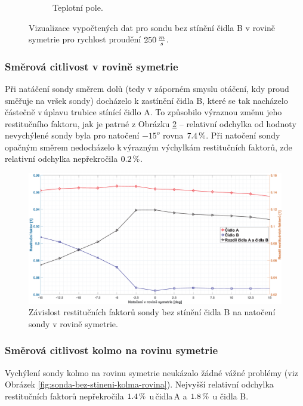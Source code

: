 \begin{figure}[ht!]
\begin{subfigure}{0.45\textwidth}
                    \caption{Teplotní pole.}
                \end{subfigure}
                \caption{Vizualizace vypočtených dat pro sondu bez stínění čidla B v rovině symetrie pro rychlost proudění $250 \, \frac{m}{s}$.}
                \label{fig:sonda-bez-stineni-vizualizace}
            \end{figure}


        \newpage
        \subsubsection{Směrová citlivost v rovině symetrie}
            Při natáčení sondy směrem dolů (tedy v záporném smyslu otáčení, kdy proud směřuje na vršek sondy) docházelo k zastínění čidla B, které se tak nacházelo částečně v\,úplavu trubice stínící čidlo A. To způsobilo výraznou změnu jeho restitučního faktoru, jak je patrné z Obrázku \ref{fig:sonda-bez-stineni-rovina-symetrie} – relativní odchylka od hodnoty nevychýlené sondy byla pro natočení $-15^o$ rovna $7.4 \, \%$. Při natočení sondy opačným směrem nedocházelo k\,výrazným výchylkám restitučních faktorů, zde relativní odchylka nepřekročila $0.2 \, \%$.
            
            \begin{figure}[ht!]
                \centering
                \includegraphics*[width=\textwidth]{400_SIMULACE_KONSTRUKCNICH_UPRAV/Grafy/01_rovina_symetrie}
                \caption{Závislost restitučních faktorů sondy bez stínění čidla B na natočení sondy v rovině symetrie.}
                \label{fig:sonda-bez-stineni-rovina-symetrie}
            \end{figure}
        \subsubsection{Směrová citlivost kolmo na rovinu symetrie}
            Vychýlení sondy kolmo na rovinu symetrie neukázalo žádné vážné problémy (viz Obrázek \ref{fig:sonda-bez-stineni-kolma-rovina}). Nejvyšší relativní odchylka restitučních faktorů nepřekročila $1.4 \, \%$ u\,čidla\,A a $1.8 \, \%$ u čidla B.
            
